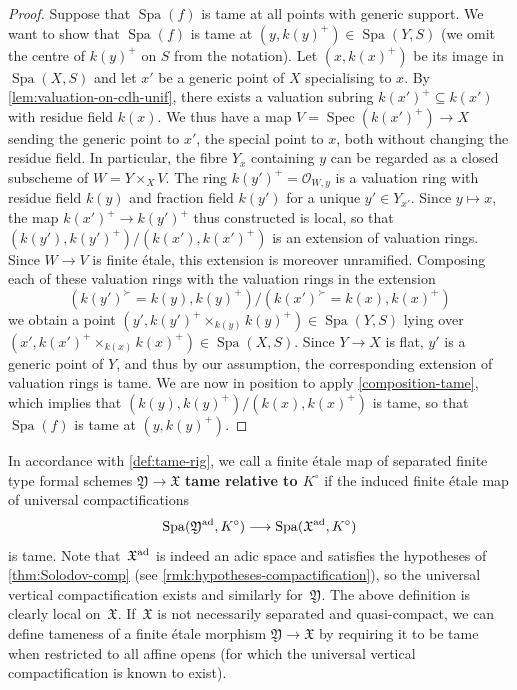 \documentclass[a4paper,twoside,11pt,reqno]{amsart}
\newcommand{\cO}{{\mathcal O}}
\newcommand{\fX}{{\mathfrak{X}}}
\newcommand{\fY}{{\mathfrak{Y}}}
\newcommand{\la}{\longrightarrow}
\DeclareMathOperator{\Spec}{Spec}
\DeclareMathOperator{\Spa}{Spa}
\theoremstyle{definition}
\numberwithin{equation}{subsection}
\begin{document}
\begin{proof}
Suppose that $\Spa(f)$ is tame at all points with generic support.
We want to show that $\Spa(f)$ is tame at $(y,k(y)^+)\in \Spa(Y, S)$ (we omit the centre of $k(y)^+$ on $S$ from the notation). Let $(x, k(x)^+)$ be its image in $\Spa(X, S)$ and let $x'$ be a generic point of $X$ specialising to $x$. By \cref{lem:valuation-on-cdh-unif}, there exists a valuation subring $k(x')^+\subseteq k(x')$ with residue field $k(x)$. We thus have a map $V=\Spec(k(x')^+)\to X$ sending the generic point to $x'$, the special point to $x$, both without changing the residue field. In particular, the fibre $Y_x$ containing $y$ can be regarded as a closed subscheme of $W = Y\times_X V$. The ring $k(y')^+ = \cO_{W,y}$ is a valuation ring with residue field $k(y)$ and fraction field $k(y')$ for a unique $y'\in Y_{x'}$. Since $y\mapsto x$, the map $k(x')^+\to k(y')^+$ thus constructed is local, so that $(k(y'), k(y')^+)/(k(x'), k(x')^+)$ is an extension of valuation rings. Since $W\to V$ is finite \'etale, this extension is moreover unramified. Composing each of these valuation rings with the valuation rings in the extension 
\[
    (k(y')^\succ=k(y), k(y)^+)  /  (k(x')^\succ = k(x), k(x)^+)
\]
we obtain a point $(y', k(y')^+\times_{k(y)} k(y)^+)\in \Spa(Y, S)$ lying over $(x', k(x')^+\times_{k(x)} k(x)^+)\in \Spa(X, S)$. Since $Y\to X$ is flat, $y'$ is a generic point of $Y$, and thus by our assumption, the corresponding extension of valuation rings is tame. We are now in position to apply \cref{composition-tame}, which implies that $(k(y), k(y)^+)/(k(x),k(x)^+)$ is tame, so that $\Spa(f)$ is tame at $(y, k(y)^+)$.
\end{proof}


In accordance with \cref{def:tame-rig}, we call a finite \'etale  map of separated finite type formal schemes $\fY\to \fX$ {\bf tame relative to $K^\circ$} if the induced finite \'etale map of universal compactifications
\[
    \Spa(\fY^{\rm ad}, K^\circ) \la \Spa(\fX^{\rm ad}, K^\circ)
\]
is tame.
Note that~$\fX^{\rm ad}$ is indeed an adic space and satisfies the hypotheses of \cref{thm:Solodov-comp} (see \cref{rmk:hypotheses-compactification}), so the universal vertical compactification exists and similarly for~$\fY$.
The above definition is clearly local on~$\fX$.
If~$\fX$ is not necessarily separated and quasi-compact, we can define tameness of a finite étale morphism $\fY \to \fX$ by requiring it to be tame when restricted to all affine opens (for which the universal vertical compactification is known to exist).
\end{document}
